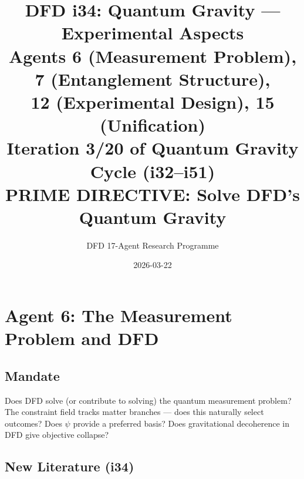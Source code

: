 \documentclass[11pt,a4paper]{article}
\title{DFD i34: Quantum Gravity --- Experimental Aspects\\[6pt]
\large Agents 6 (Measurement Problem), 7 (Entanglement Structure),\\
12 (Experimental Design), 15 (Unification)\\[6pt]
\normalsize Iteration 3/20 of Quantum Gravity Cycle (i32--i51)\\
PRIME DIRECTIVE: Solve DFD's Quantum Gravity}
\author{DFD 17-Agent Research Programme}
\date{2026-03-22}
\begin{document}
\maketitle
\tableofcontents
\newpage

\section{Agent 6: The Measurement Problem and DFD}
\label{sec:agent6}

\subsection{Mandate}

Does DFD solve (or contribute to solving) the quantum measurement problem? The constraint field tracks matter branches --- does this naturally select outcomes? Does $\psi$ provide a preferred basis? Does gravitational decoherence in DFD give objective collapse?

\subsection{New Literature (i34)}
\end{document}

